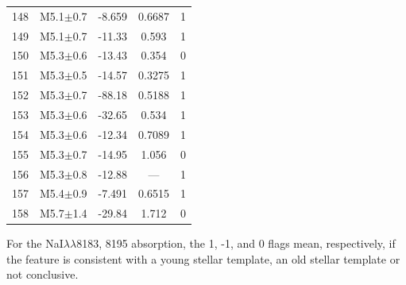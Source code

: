 \documentclass[12pt]{article}
\begin{document}
\begin{table}
\begin{threeparttable}
\begin{minipage}{0.48\textwidth}
\begin{tabular}{ccccc}
	  	148 & M5.1$\pm$0.7  & -8.659  & 0.6687  & 1   \\ 
	  	149 & M5.1$\pm$0.7  & -11.33  & 0.593   & 1   \\ 
	  	150 & M5.3$\pm$0.6  & -13.43  & 0.354   & 0   \\ 
	  	151 & M5.3$\pm$0.5  & -14.57  & 0.3275  & 1   \\ 
	  	152 & M5.3$\pm$0.7  & -88.18  & 0.5188  & 1   \\ 
	  	153 & M5.3$\pm$0.6  & -32.65  & 0.534   & 1   \\ 
	  	154 & M5.3$\pm$0.6  & -12.34  & 0.7089  & 1   \\ 
	  	155 & M5.3$\pm$0.7  & -14.95  & 1.056   & 0   \\ 
	  	156 & M5.3$\pm$0.8  & -12.88  & ---     & 1   \\ 
	  	157 & M5.4$\pm$0.9  & -7.491  & 0.6515  & 1   \\ 
	  	158 & M5.7$\pm$1.4  & -29.84  & 1.712   & 0   \\ 
		\bottomrule
	  \end{tabular}
	  \begin{tablenotes}
	    For the NaI$\lambda\lambda$8183, 8195 absorption, the 1, -1, and 0 flags mean, respectively, if the feature is consistent with a young stellar template, an old stellar template or not conclusive.\\
	  \end{tablenotes}
	\end{minipage}
 \end{threeparttable}
\end{table}
\end{document}
